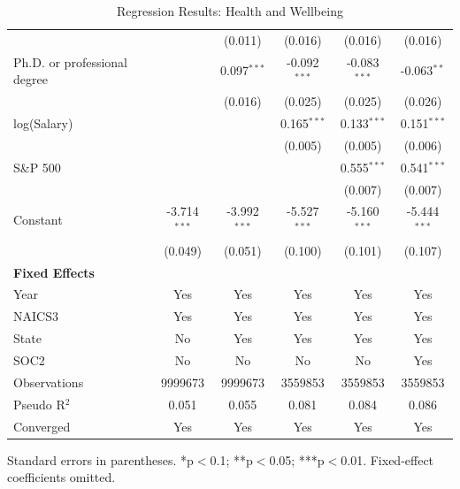 \begin{table}[!htbp]
\begin{tabular}{lccccc}
 &  & (0.011) & (0.016) & (0.016) & (0.016) \\
Ph.D. or professional degree &  & 0.097$^{***}$ & -0.092$^{***}$ & -0.083$^{***}$ & -0.063$^{**}$ \\
 &  & (0.016) & (0.025) & (0.025) & (0.026) \\
log(Salary) &  &  & 0.165$^{***}$ & 0.133$^{***}$ & 0.151$^{***}$ \\
 &  &  & (0.005) & (0.005) & (0.006) \\
S\&P 500 &  &  &  & 0.555$^{***}$ & 0.541$^{***}$ \\
 &  &  &  & (0.007) & (0.007) \\
Constant & -3.714$^{***}$ & -3.992$^{***}$ & -5.527$^{***}$ & -5.160$^{***}$ & -5.444$^{***}$ \\
 & (0.049) & (0.051) & (0.100) & (0.101) & (0.107) \\
\midrule
\textbf{Fixed Effects} &  &  &  &  &  \\
Year & Yes & Yes & Yes & Yes & Yes \\
NAICS3 & Yes & Yes & Yes & Yes & Yes \\
State & No & Yes & Yes & Yes & Yes \\
SOC2 & No & No & No & No & Yes \\
Observations & 9999673 & 9999673 & 3559853 & 3559853 & 3559853 \\
Pseudo R$^2$ & 0.051 & 0.055 & 0.081 & 0.084 & 0.086 \\
Converged & Yes & Yes & Yes & Yes & Yes \\
\bottomrule
\end{tabular}
\caption{Regression Results: Health and Wellbeing}
\par\smallskip\scriptsize Standard errors in parentheses. *p$<$0.1; **p$<$0.05; ***p$<$0.01. Fixed-effect coefficients omitted.
\end{table}